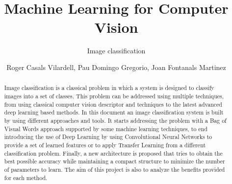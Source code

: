 \documentclass[runningheads]{llncs}
\begin{document}
%
\title{Machine Learning for Computer Vision}
\subtitle{Image classification}
%
%
\author{Roger Casals Vilardell, Pau Domingo Gregorio, Joan Fontanals Martinez}
%
%
%
\maketitle              %
%
\begin{abstract}
Image classification is a classical problem in which a system is designed to classify images into a set of classes. This problem can be addressed using multiple techniques, from using classical computer vision descriptor and techniques to the latest advanced deep learning based methods.
In this document an image classification system is built by using different approaches and tools. It starts addressing the problem with a Bag of Visual Words approach supported by some machine learning techniques, to end introducing the use of Deep Learning by using Convolutional Neural Networks to provide a set of learned features or to apply Transfer Learning from a different classification problem. Finally, a new architecture is proposed that tries to obtain the best possible accuracy while maintaining a compact structure to minimize the number of parameters to learn. The aim of this project is also to analyze the benefits provided for each method. \cite{opencv_library}

\end{abstract}
\end{document}
